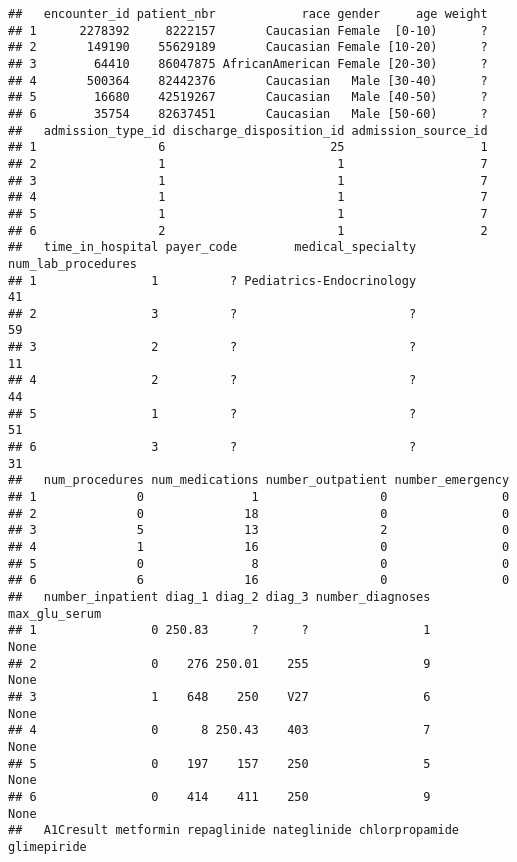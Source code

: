 \documentclass[
]{article}
\begin{document}
\begin{verbatim}
##   encounter_id patient_nbr            race gender     age weight
## 1      2278392     8222157       Caucasian Female  [0-10)      ?
## 2       149190    55629189       Caucasian Female [10-20)      ?
## 3        64410    86047875 AfricanAmerican Female [20-30)      ?
## 4       500364    82442376       Caucasian   Male [30-40)      ?
## 5        16680    42519267       Caucasian   Male [40-50)      ?
## 6        35754    82637451       Caucasian   Male [50-60)      ?
##   admission_type_id discharge_disposition_id admission_source_id
## 1                 6                       25                   1
## 2                 1                        1                   7
## 3                 1                        1                   7
## 4                 1                        1                   7
## 5                 1                        1                   7
## 6                 2                        1                   2
##   time_in_hospital payer_code        medical_specialty num_lab_procedures
## 1                1          ? Pediatrics-Endocrinology                 41
## 2                3          ?                        ?                 59
## 3                2          ?                        ?                 11
## 4                2          ?                        ?                 44
## 5                1          ?                        ?                 51
## 6                3          ?                        ?                 31
##   num_procedures num_medications number_outpatient number_emergency
## 1              0               1                 0                0
## 2              0              18                 0                0
## 3              5              13                 2                0
## 4              1              16                 0                0
## 5              0               8                 0                0
## 6              6              16                 0                0
##   number_inpatient diag_1 diag_2 diag_3 number_diagnoses max_glu_serum
## 1                0 250.83      ?      ?                1          None
## 2                0    276 250.01    255                9          None
## 3                1    648    250    V27                6          None
## 4                0      8 250.43    403                7          None
## 5                0    197    157    250                5          None
## 6                0    414    411    250                9          None
##   A1Cresult metformin repaglinide nateglinide chlorpropamide glimepiride

\end{verbatim}
\end{document}
